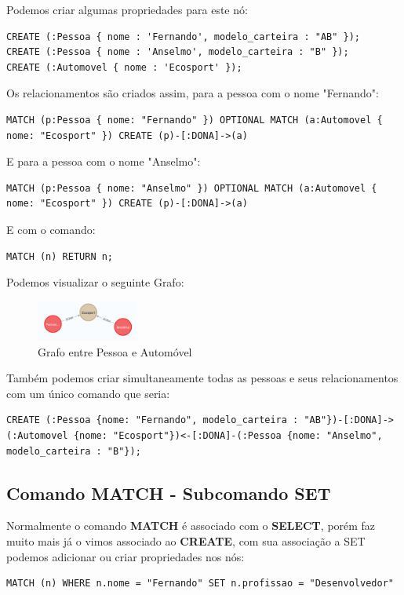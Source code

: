 Podemos criar algumas propriedades para este nó:
\begin{lstlisting}[]
CREATE (:Pessoa { nome : 'Fernando', modelo_carteira : "AB" });
CREATE (:Pessoa { nome : 'Anselmo', modelo_carteira : "B" });
CREATE (:Automovel { nome : 'Ecosport' });
\end{lstlisting}

Os relacionamentos são criados assim, para a pessoa com o nome "Fernando":
\begin{lstlisting}[]
MATCH (p:Pessoa { nome: "Fernando" }) OPTIONAL MATCH (a:Automovel { nome: "Ecosport" }) CREATE (p)-[:DONA]->(a)
\end{lstlisting}

E para a pessoa com o nome "Anselmo":
\begin{lstlisting}[]
MATCH (p:Pessoa { nome: "Anselmo" }) OPTIONAL MATCH (a:Automovel { nome: "Ecosport" }) CREATE (p)-[:DONA]->(a)
\end{lstlisting}

E com o comando:
\begin{lstlisting}[]
MATCH (n) RETURN n;
\end{lstlisting}

Podemos visualizar o seguinte Grafo:
\begin{figure}[H]
	\centering
	\includegraphics[width=0.3\textwidth]{imagens/relacionamento}
	\caption{Grafo entre Pessoa e Automóvel}
\end{figure}

Também podemos criar simultaneamente todas as pessoas e seus relacionamentos com um único comando que seria:
\begin{lstlisting}[]
CREATE (:Pessoa {nome: "Fernando", modelo_carteira : "AB"})-[:DONA]->(:Automovel {nome: "Ecosport"})<-[:DONA]-(:Pessoa {nome: "Anselmo", modelo_carteira : "B"});
\end{lstlisting}

\subsection{Comando MATCH - Subcomando SET}
Normalmente o comando \textbf{MATCH} é associado com o \textbf{SELECT}, porém faz muito mais já o vimos associado ao \textbf{CREATE}, com sua associação a SET podemos adicionar ou criar propriedades nos nós:
\begin{lstlisting}[]
MATCH (n) WHERE n.nome = "Fernando" SET n.profissao = "Desenvolvedor"
\end{lstlisting}


